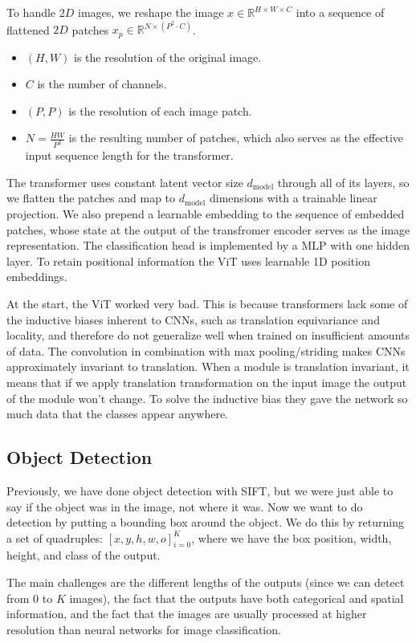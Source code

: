 To handle $2D$ images, we reshape the image $x \in \mathbb{R}^{H\times W \times C}$ into a sequence of flattened $2D$ patches $x_p \in \mathbb{R}^{N \times (P^2 \cdot C)}$.
\begin{itemize}
  \item $(H, W)$ is the resolution of the original image.
  \item $C$ is the number of channels.
  \item $(P, P)$ is the resolution of each image patch.
  \item $N = \frac{HW}{P^2}$ is the resulting number of patches, which also serves as the effective input sequence length for the transformer.
\end{itemize}

The transformer uses constant latent vector size $d_{\text{model}}$ through all of its layers, so we flatten the patches and map to $d_{\text{model}}$ dimensions with a trainable linear projection.
We also prepend a learnable embedding to the sequence of embedded patches, whose state at the output of the transfromer encoder serves as the image representation.
The classification head is implemented by a MLP with one hidden layer.
To retain positional information the ViT uses learnable 1D position embeddings.

At the start, the ViT worked very bad.
This is because transformers lack some of the inductive biases inherent to CNNs, such as translation equivariance and locality, and therefore do not generalize well when trained on insufficient amounts of data.
The convolution in combination with max pooling/striding makes CNNs approximately invariant to translation.
When a module is translation invariant, it means that if we apply translation transformation on the input image the output of the module won't change.
To solve the inductive bias they gave the network so much data that the classes appear anywhere.

\subsection{Object Detection}
Previously, we have done object detection with SIFT, but we were just able to say if the object was in the image, not where it was.
Now we want to do detection by putting a bounding box around the object.
We do this by returning a set of quadruples: $[x, y, h, w, o]_{i=0}^{K}$, where we have the box position, width, height, and class of the output.

The main challenges are the different lengths of the outputs (since we can detect from 0 to $K$ images), the fact that the outputs have both categorical and spatial information, and the fact that the images are usually processed at higher resolution than neural networks for image classification.

